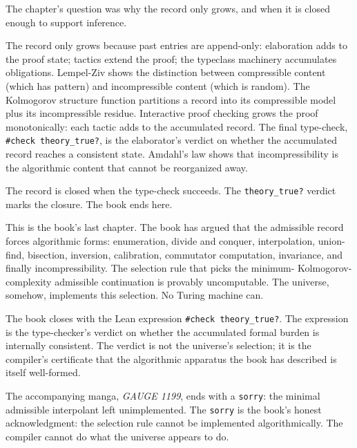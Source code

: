 \begin{bridge}

The chapter's question was why the record only grows, and when it is
closed enough to support inference.

The record only grows because past entries are append-only:
elaboration adds to the proof state; tactics extend the proof; the
typeclass machinery accumulates obligations. Lempel-Ziv shows the
distinction between compressible content (which has pattern) and
incompressible content (which is random). The Kolmogorov structure
function partitions a record into its compressible model plus its
incompressible residue. Interactive proof checking grows the proof
monotonically: each tactic adds to the accumulated record. The
final type-check, \texttt{\#check theory\_true?}, is the
elaborator's verdict on whether the accumulated record reaches a
consistent state. Amdahl's law shows that incompressibility is the
algorithmic content that cannot be reorganized away.

The record is closed when the type-check succeeds. The
\texttt{theory\_true?} verdict marks the closure. The book ends
here.

This is the book's last chapter. The book has argued that the
admissible record forces algorithmic forms: enumeration, divide
and conquer, interpolation, union-find, bisection, inversion,
calibration, commutator computation, invariance, and finally
incompressibility. The selection rule that picks the minimum-
Kolmogorov-complexity admissible continuation is provably
uncomputable. The universe, somehow, implements this selection.
No Turing machine can.

The book closes with the Lean expression \texttt{\#check
theory\_true?}. The expression is the type-checker's verdict on
whether the accumulated formal burden is internally consistent.
The verdict is not the universe's selection; it is the
compiler's certificate that the algorithmic apparatus the book
has described is itself well-formed.

The accompanying manga, \emph{GAUGE 1199}, ends with a
\texttt{sorry}: the minimal admissible interpolant left
unimplemented. The \texttt{sorry} is the book's honest
acknowledgment: the selection rule cannot be implemented
algorithmically. The compiler cannot do what the universe
appears to do.

\end{bridge}


